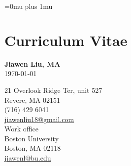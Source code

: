 \documentclass[12pt, letterpaper]{report}   %
\begin{document}

\newpage
\singlespace
\Urlmuskip=0mu plus 1mu\relax %




\chapter*{Curriculum Vitae}
\begin{large}
\begin{center}
\textbf{Jiawen Liu, MA}\\ 
\today\\
\end{center}
\end{large}

\setlength{\columnsep}{1.5in}
\begin{multicols}{1}{
\begin{center}{
21 Overlook Ridge Ter, unit 527 \\ Revere, MA 02151 \\ (716) 429 6041 \\ \hyperlink{mailto:personaladdress@gmail.com}{jiawenliu18@gmail.com}\\
Work office \\Boston University \\ Boston, MA 02118 \\\hyperlink{mailto:buemail@bu.edu}{jiawenl@bu.edu}\\}
\end{center}}
\end{multicols}
\end{document}
